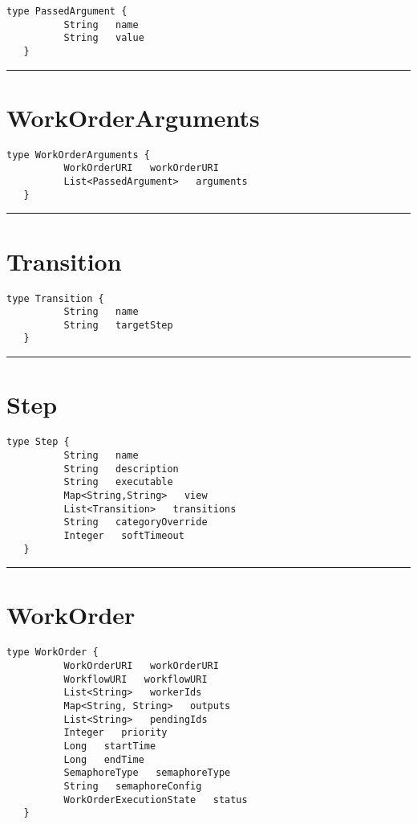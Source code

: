 \begin{lstlisting}[style=nonumbers]
   type PassedArgument {
          String   name
          String   value
   }
\end{lstlisting}

\rule{12cm}{2pt}
\section{WorkOrderArguments}
\label{type:WorkOrderArguments}

\begin{lstlisting}[style=nonumbers]
   type WorkOrderArguments {
          WorkOrderURI   workOrderURI
          List<PassedArgument>   arguments
   }
\end{lstlisting}

\rule{12cm}{2pt}
\section{Transition}
\label{type:Transition}

\begin{lstlisting}[style=nonumbers]
   type Transition {
          String   name
          String   targetStep
   }
\end{lstlisting}

\rule{12cm}{2pt}
\section{Step}
\label{type:Step}

\begin{lstlisting}[style=nonumbers]
   type Step {
          String   name
          String   description
          String   executable
          Map<String,String>   view
          List<Transition>   transitions
          String   categoryOverride
          Integer   softTimeout
   }
\end{lstlisting}

\rule{12cm}{2pt}
\section{WorkOrder}
\label{type:WorkOrder}

\begin{lstlisting}[style=nonumbers]
   type WorkOrder {
          WorkOrderURI   workOrderURI
          WorkflowURI   workflowURI
          List<String>   workerIds
          Map<String, String>   outputs
          List<String>   pendingIds
          Integer   priority
          Long   startTime
          Long   endTime
          SemaphoreType   semaphoreType
          String   semaphoreConfig
          WorkOrderExecutionState   status
   }
\end{lstlisting}

